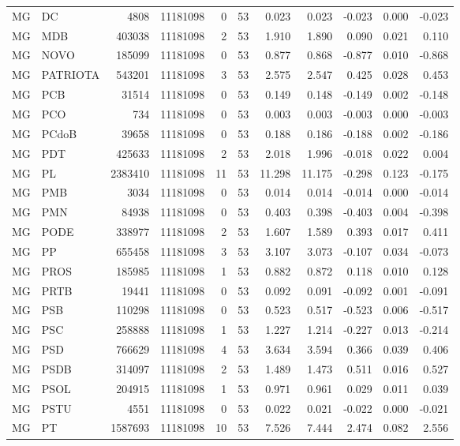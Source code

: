 \begin{landscape}
\begin{longtable}{llrrrrrrrrr}
MG & DC & 4808 & 11181098 & 0 & 53 & 0.023 & 0.023 & -0.023 & 0.000 & -0.023 \\
MG & MDB & 403038 & 11181098 & 2 & 53 & 1.910 & 1.890 & 0.090 & 0.021 & 0.110 \\
MG & NOVO & 185099 & 11181098 & 0 & 53 & 0.877 & 0.868 & -0.877 & 0.010 & -0.868 \\
MG & PATRIOTA & 543201 & 11181098 & 3 & 53 & 2.575 & 2.547 & 0.425 & 0.028 & 0.453 \\
MG & PCB & 31514 & 11181098 & 0 & 53 & 0.149 & 0.148 & -0.149 & 0.002 & -0.148 \\
MG & PCO & 734 & 11181098 & 0 & 53 & 0.003 & 0.003 & -0.003 & 0.000 & -0.003 \\
MG & PCdoB & 39658 & 11181098 & 0 & 53 & 0.188 & 0.186 & -0.188 & 0.002 & -0.186 \\
MG & PDT & 425633 & 11181098 & 2 & 53 & 2.018 & 1.996 & -0.018 & 0.022 & 0.004 \\
MG & PL & 2383410 & 11181098 & 11 & 53 & 11.298 & 11.175 & -0.298 & 0.123 & -0.175 \\
MG & PMB & 3034 & 11181098 & 0 & 53 & 0.014 & 0.014 & -0.014 & 0.000 & -0.014 \\
MG & PMN & 84938 & 11181098 & 0 & 53 & 0.403 & 0.398 & -0.403 & 0.004 & -0.398 \\
MG & PODE & 338977 & 11181098 & 2 & 53 & 1.607 & 1.589 & 0.393 & 0.017 & 0.411 \\
MG & PP & 655458 & 11181098 & 3 & 53 & 3.107 & 3.073 & -0.107 & 0.034 & -0.073 \\
MG & PROS & 185985 & 11181098 & 1 & 53 & 0.882 & 0.872 & 0.118 & 0.010 & 0.128 \\
MG & PRTB & 19441 & 11181098 & 0 & 53 & 0.092 & 0.091 & -0.092 & 0.001 & -0.091 \\
MG & PSB & 110298 & 11181098 & 0 & 53 & 0.523 & 0.517 & -0.523 & 0.006 & -0.517 \\
MG & PSC & 258888 & 11181098 & 1 & 53 & 1.227 & 1.214 & -0.227 & 0.013 & -0.214 \\
MG & PSD & 766629 & 11181098 & 4 & 53 & 3.634 & 3.594 & 0.366 & 0.039 & 0.406 \\
MG & PSDB & 314097 & 11181098 & 2 & 53 & 1.489 & 1.473 & 0.511 & 0.016 & 0.527 \\
MG & PSOL & 204915 & 11181098 & 1 & 53 & 0.971 & 0.961 & 0.029 & 0.011 & 0.039 \\
MG & PSTU & 4551 & 11181098 & 0 & 53 & 0.022 & 0.021 & -0.022 & 0.000 & -0.021 \\
MG & PT & 1587693 & 11181098 & 10 & 53 & 7.526 & 7.444 & 2.474 & 0.082 & 2.556 \\

\end{longtable}
\end{landscape}
